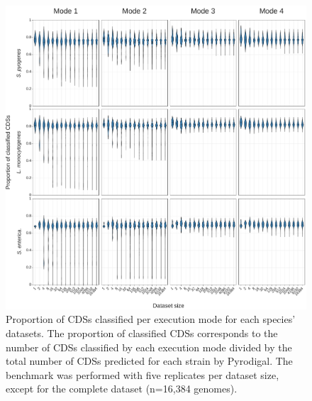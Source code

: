 \newpage
\begin{figure}[h!]
    \centering
    \includegraphics[angle=0,width=\textwidth]{figures/chapter 2/FigureS15.pdf}
    \caption{Proportion of CDSs classified per execution mode for each species’ datasets. The proportion of classified CDSs corresponds to the number of CDSs classified by each execution mode divided by the total number of CDSs predicted for each strain by Pyrodigal. The benchmark was performed with five replicates per dataset size, except for the complete dataset (n=16,384 genomes).}
    \label{fig:chap2_figureS15}
\end{figure}

